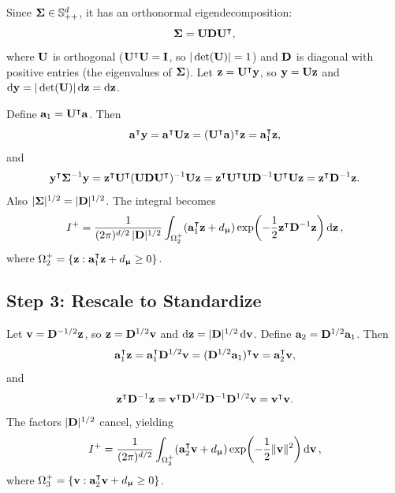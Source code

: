 \documentclass[11pt, letterpaper]{article}
\newcommand{\bSigma}{\vb{\Sigma}}
\newcommand{\bmu}{\boldsymbol{\upmu}}
\begin{document}
Since $\bSigma \in \mathbb{S}^d_{++}$, it has an orthonormal eigendecomposition:
\begin{equation}
    \bSigma = \vb{U}\vb{D}\vb{U}^{\intercal},
\end{equation}
where $\vb{U}$ is orthogonal ($\vb{U}^{\intercal}\vb{U} = \vb{I}$, so $|\det(\vb{U})| = 1$) and $\vb{D}$ is diagonal with positive entries (the eigenvalues of $\bSigma$). Let $\vb{z} = \vb{U}^{\intercal}\vb{y}$, so $\vb{y} = \vb{U}\vb{z}$ and $\dd{\vb{y}} = |\det(\vb{U})|\dd{\vb{z}} = \dd{\vb{z}}$.

Define $\vb{a}_1 = \vb{U}^{\intercal}\vb{a}$. Then
\begin{equation}
    \vb{a}^{\intercal}\vb{y} = \vb{a}^{\intercal}\vb{U}\vb{z} = (\vb{U}^{\intercal}\vb{a})^{\intercal}\vb{z} = \vb{a}_1^{\intercal}\vb{z},
\end{equation}
and
\begin{equation}
    \vb{y}^{\intercal}\bSigma^{-1}\vb{y} = \vb{z}^{\intercal}\vb{U}^{\intercal}(\vb{U}\vb{D}\vb{U}^{\intercal})^{-1}\vb{U}\vb{z} = \vb{z}^{\intercal}\vb{U}^{\intercal}\vb{U}\vb{D}^{-1}\vb{U}^{\intercal}\vb{U}\vb{z} = \vb{z}^{\intercal}\vb{D}^{-1}\vb{z}.
\end{equation}
Also $|\bSigma|^{1/2} = |\vb{D}|^{1/2}$. The integral becomes
\begin{equation}
    I^+ = \frac{1}{(2\pi)^{d/2}\, |\vb{D}|^{1/2}} \int_{\Omega^+_2} (\vb{a}_1^{\intercal}\vb{z} + d_{\bmu}) \exp\!\left(-\frac{1}{2}\vb{z}^{\intercal}\vb{D}^{-1}\vb{z}\right) \dd{\vb{z}},
\end{equation}
where $\Omega^+_2 = \{\vb{z} : \vb{a}_1^{\intercal}\vb{z} + d_{\bmu} \geq 0\}$.

\subsection{Step 3: Rescale to Standardize}

Let $\vb{v} = \vb{D}^{-1/2}\vb{z}$, so $\vb{z} = \vb{D}^{1/2}\vb{v}$ and $\dd{\vb{z}} = |\vb{D}|^{1/2}\dd{\vb{v}}$. Define $\vb{a}_2 = \vb{D}^{1/2}\vb{a}_1$. Then
\begin{equation}
    \vb{a}_1^{\intercal}\vb{z} = \vb{a}_1^{\intercal}\vb{D}^{1/2}\vb{v} = (\vb{D}^{1/2}\vb{a}_1)^{\intercal}\vb{v} = \vb{a}_2^{\intercal}\vb{v},
\end{equation}
and
\begin{equation}
    \vb{z}^{\intercal}\vb{D}^{-1}\vb{z} = \vb{v}^{\intercal}\vb{D}^{1/2}\vb{D}^{-1}\vb{D}^{1/2}\vb{v} = \vb{v}^{\intercal}\vb{v}.
\end{equation}
The factors $|\vb{D}|^{1/2}$ cancel, yielding
\begin{equation}\label{eq:after_rescale}
    I^+ = \frac{1}{(2\pi)^{d/2}} \int_{\Omega^+_3} (\vb{a}_2^{\intercal}\vb{v} + d_{\bmu}) \exp\!\left(-\frac{1}{2}\|\vb{v}\|^2\right) \dd{\vb{v}},
\end{equation}
where $\Omega^+_3 = \{\vb{v} : \vb{a}_2^{\intercal}\vb{v} + d_{\bmu} \geq 0\}$.
\end{document}

